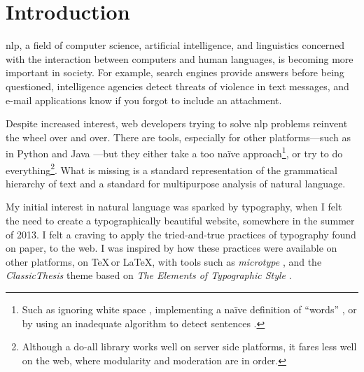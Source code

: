 
\begingroup
\let\clearpage\relax
\let\cleardoublepage\relax
\let\cleardoublepage\relax

\chapter*{Introduction}

\Gls{nlp}, a field of computer science, artificial intelligence, and
  linguistics concerned with the interaction between computers and human
  languages, is becoming more important in society.
For example, search engines provide answers before being questioned,
  intelligence agencies detect threats of violence in text messages, and
  e-mail applications know if you forgot to include an attachment.

Despite increased interest, web developers trying to solve \gls{nlp} problems
  reinvent the wheel over and over.
There are tools, especially for other platforms---such as in Python
  \autocite{nltk-source} and Java \autocite{opennlp-source}---but they either
  take a too na\"ive approach\footnote{Such as ignoring white space
    \autocite{loadfive/knwl-source-code}, implementing a na\"ive
    definition of ``words'' \autocite{nhunzaker/speakeasy-source-code},
    or by using an inadequate algorithm to detect sentences
    \autocite[][]{nytimes/emphasis-source-code}.}, or try to do
  everything\footnote{Although a do-all library \autocite[such
  as][]{NaturalNode/natural-source-code} works well on server side
  platforms, it fares less well on the web, where modularity and moderation
  are in order.}.
What is missing is a standard representation of the grammatical hierarchy
  of text and a standard for multipurpose analysis of natural language.

My initial interest in natural language was sparked by typography, when I
  felt the need to create a typographically beautiful website, somewhere in
  the summer of 2013.
I felt a craving to apply the tried-and-true practices of typography found on
  paper, to the web.
I was inspired by how these practices were available on other platforms,
  on \TeX\,or \LaTeX, with tools such as \emph{microtype} \autocite{microtype},
  and the \emph{ClassicThesis} theme \autocite{classicthesis} based on
  \emph{The Elements of Typographic Style}
  \autocite{bringhurst-element-typographic-style}.

